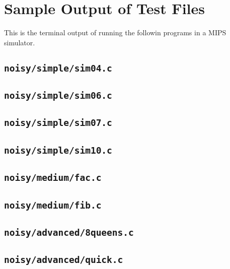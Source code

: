 \documentclass[a4paper,11pt]{article}
\begin{document}
\section{Sample Output of Test Files}
This is the terminal output of running the followin programs in a MIPS
simulator.

\subsection{\texttt{noisy/simple/sim04.c}}     
\subsection{\texttt{noisy/simple/sim06.c}}     
\subsection{\texttt{noisy/simple/sim07.c}}     
\subsection{\texttt{noisy/simple/sim10.c}}     
\subsection{\texttt{noisy/medium/fac.c}}       
\subsection{\texttt{noisy/medium/fib.c}}       
\subsection{\texttt{noisy/advanced/8queens.c}} 
\subsection{\texttt{noisy/advanced/quick.c}}   
\end{document}
